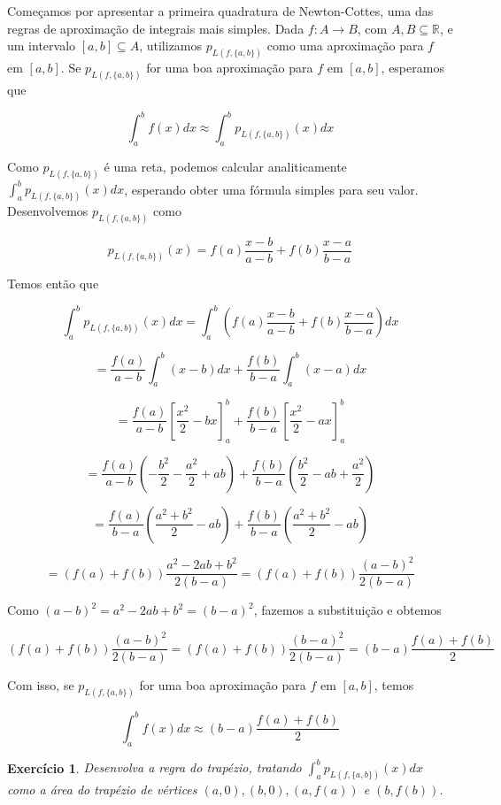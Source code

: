 \documentclass[]{article}
\newtheorem{exercicio}{Exercício}
\numberwithin{equation}{section}
\begin{document}
Começamos por apresentar a primeira quadratura de Newton-Cottes, uma
das regras de aproximação de integrais mais simples. Dada
$f : A \to B$, com $A, B \subseteq \mathbb{R}$, e um intervalo
$[a, b] \subseteq A$, utilizamos $p_{L(f, \{a, b\})}$ como uma
aproximação para $f$ em $[a, b]$. Se $p_{L(f, \{a, b\})}$ for uma boa
aproximação para $f$ em $[a, b]$, esperamos que

$$
\int_{a}^{b} f(x) dx \approx \int_{a}^{b} p_{L(f, \{a, b\})}(x) dx
$$

Como $p_{L(f, \{a, b\})}$ é uma reta, podemos calcular analiticamente
$\int_{a}^{b} p_{L(f, \{a, b\})}(x) dx$, esperando obter uma fórmula
simples para seu valor. Desenvolvemos $p_{L(f, \{a, b\})}$ como

$$
p_{L(f, \{a, b\})}(x) = f(a) \frac{x - b}{a - b} + f(b) \frac{x - a}{b - a}
$$

Temos então que

$$
\int_{a}^{b} p_{L(f, \{a, b\})}(x) dx = \int_{a}^{b} \left(f(a) \frac{x - b}{a - b} + f(b) \frac{x - a}{b - a}\right) dx
$$

$$
= \frac{f(a)}{a - b} \int_{a}^{b} (x - b) dx + \frac{f(b)}{b - a} \int_{a}^{b} (x - a) dx
$$

$$
= \frac{f(a)}{a - b} \left[\frac{x^2}{2} - bx\right]_a^b + \frac{f(b)}{b - a} \left[\frac{x^2}{2} - ax\right]_a^b
$$

$$
= \frac{f(a)}{a - b} \left(-\frac{b^2}{2} - \frac{a^2}{2} + ab\right) + \frac{f(b)}{b - a} \left(\frac{b^2}{2} - ab + \frac{a^2}{2}\right)
$$

$$
= \frac{f(a)}{b - a} \left(\frac{a^2 + b^2}{2} - ab\right) + \frac{f(b)}{b - a} \left(\frac{a^2 + b^2}{2} - ab\right)
$$

$$
= (f(a) + f(b)) \frac{a^2 - 2ab + b^2}{2(b - a)} = (f(a) + f(b)) \frac{(a - b)^2}{2(b - a)}
$$

Como $(a - b)^2 = a^2 - 2ab + b^2 = (b - a)^2$, fazemos a substituição e obtemos

$$
(f(a) + f(b)) \frac{(a - b)^2}{2(b - a)} = (f(a) + f(b)) \frac{(b - a)^2}{2(b - a)} = (b - a) \frac{f(a) + f(b)}{2}
$$

Com isso, se $p_{L(f, \{a, b\})}$ for uma boa aproximação para $f$ em $[a, b]$, temos

$$
\int_{a}^{b} f(x) dx \approx (b - a) \frac{f(a) + f(b)}{2}
$$

\begin{exercicio}
  Desenvolva a regra do trapézio, tratando
  $\int_{a}^{b} p_{L(f, \{a, b\})}(x) dx$ como a área do trapézio de
  vértices $(a, 0), (b, 0), (a, f(a))$ e $(b, f(b))$.
\end{exercicio}
\end{document}
